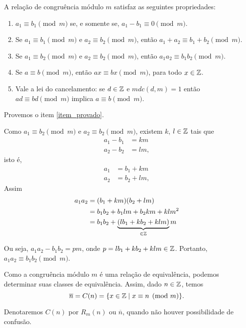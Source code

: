 \begin{teorema}
	A rela{\c c}{\~a}o de congru{\^e}ncia m{\'o}dulo $m$ satisfaz as seguintes propriedades:
	\begin{enumerate}[label={\roman*})]
		\item $a_{1}\equiv b_{1}\pmod{m}$ se, e somente se, $a_{1}-b_{1}\equiv 0\pmod{m}$.
		\item Se $a_{1}\equiv b_{1}\pmod{m}$ e $a_{2}\equiv b_{2}\pmod{m}$, ent{\~a}o $a_{1}+a_{2}\equiv b_{1}+b_{2}\pmod{m}$.
		\item Se $a_{1}\equiv b_{2}\pmod{m}$ e $a_{2}\equiv b_{2}\pmod{m}$, ent{\~a}o $a_{1}a_{2}\equiv b_{1}b_{2}\pmod{m}$.\label{item_provado}
		\item Se $a\equiv b\pmod{m}$, ent{\~a}o $ax\equiv bx\pmod{m}$, para todo $x \in \mathbb{Z}$.
		\item Vale a lei do cancelamento: se $d \in \mathbb{Z}$ e $mdc(d,m) = 1$ ent{\~a}o $ad \equiv bd \pmod{m}$ implica $a\equiv b \pmod{m}$.
	\end{enumerate}
\end{teorema}
\begin{prova}
	Provemos o item \ref{item_provado}.
	
	Como $a_{1}\equiv b_{2}\pmod{m}$ e $a_{2}\equiv b_{2}\pmod{m}$, existem $k$, $l \in \mathbb{Z}$ tais que
	\begin{align*}
		a_1 - b_1 &= km\\
		a_2 - b_2 &= lm,
	\end{align*}
	isto \'e,
	\begin{align*}
		a_1 &= b_1 + km\\
		a_2 &= b_2 + lm,
	\end{align*}
	Assim
	\begin{align*}
		a_1a_2 &= (b_1 + km)(b_2 + lm) \\ &= b_1b_2 + b_1lm + b_2km + klm^2 \\ &= b_1b_2 + \underbrace{(lb_{1}+kb_{2}+klm)}_{\in \mathbb{Z}}m
	\end{align*}
	
	Ou seja, $a_1a_2 - b_1b_2 = pm$, onde $p = lb_1 + kb_2 + klm \in \mathbb{Z}$. Portanto, $a_1a_2 \equiv b_1b_2 \pmod{m}$.
\end{prova}

Como a congru{\^e}ncia m{\'o}dulo $m$ {\'e} uma rela{\c c}{\~a}o de equival{\^e}ncia, podemos determinar suas classes de equival{\^e}ncia. Assim, dado $n \in \mathbb{Z}$, temos
\[
	\overline{n} = C(n) = \{x \in \mathbb{Z} \mid x\equiv n \pmod{m}\}.
\]

Denotaremos $C(n)$ por $R_{m}(n)$ ou $\overline{n}$, quando n{\~a}o houver possibilidade de confus{\~a}o.

